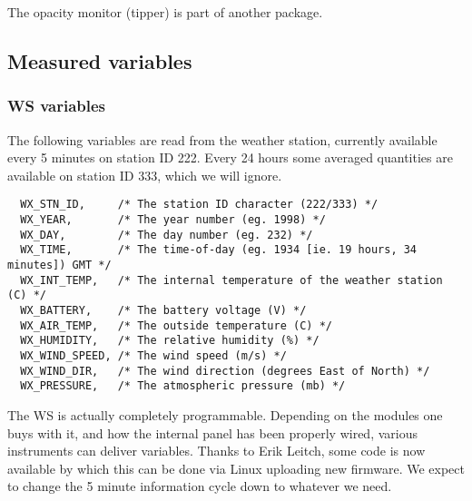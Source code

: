 \documentclass[11pt]{article}
\begin{document}



The opacity monitor (tipper) is part of another package.


% 
% 

\subsection{Measured variables}

\subsubsection{WS variables}
The following variables are read from the weather station, currently
available every 5 minutes on station ID 222.  Every 24 hours 
some averaged quantities are available on station ID 333, which
we will ignore.

\footnotesize
\begin{verbatim}
  WX_STN_ID,     /* The station ID character (222/333) */
  WX_YEAR,       /* The year number (eg. 1998) */
  WX_DAY,        /* The day number (eg. 232) */
  WX_TIME,       /* The time-of-day (eg. 1934 [ie. 19 hours, 34 minutes]) GMT */
  WX_INT_TEMP,   /* The internal temperature of the weather station (C) */
  WX_BATTERY,    /* The battery voltage (V) */
  WX_AIR_TEMP,   /* The outside temperature (C) */
  WX_HUMIDITY,   /* The relative humidity (%) */
  WX_WIND_SPEED, /* The wind speed (m/s) */
  WX_WIND_DIR,   /* The wind direction (degrees East of North) */
  WX_PRESSURE,   /* The atmospheric pressure (mb) */
\end{verbatim}
\normalsize

The WS is actually completely programmable. Depending on the modules one buys with it,
and how the internal panel has been properly wired, various instruments can deliver
variables. Thanks to Erik Leitch, some code is now available by which this can be done
via Linux uploading new firmware. We expect to change the 5 minute information cycle
down to whatever we need.
\end{document}
